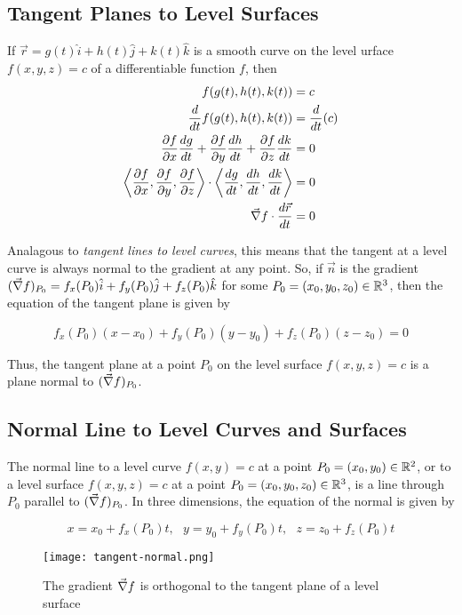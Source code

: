\subsection{Tangent Planes to Level Surfaces}
If $\vec{r} = g(t)\hat{i} + h(t)\hat{j} + k(t)\hat{k}$ is a smooth curve on the level urface $f(x, y, z) = c$ of a differentiable
function $f$, then
\begin{align*}
    f(g(t), h(t), k(t)) &= c \\
    \frac{d}{dt} f(g(t), h(t), k(t)) &= \frac{d}{dt}(c) \\
    \frac{\partial f}{\partial x} \frac{dg}{dt} + \frac{\partial f}{\partial y} \frac{dh}{dt} + \frac{\partial f}{\partial z} \frac{dk}{dt} &= 0 \\
    \left\langle \frac{\partial f}{\partial x}, \frac{\partial f}{\partial y}, \frac{\partial f}{\partial z} \right\rangle \cdot
    \left\langle \frac{dg}{dt}, \frac{dh}{dt}, \frac{dk}{dt} \right\rangle &= 0 \\
    \vec{\nabla} f \cdot \frac{d\vec{r}}{dt} &= 0
\end{align*}

Analagous to \textit{tangent lines to level curves}, this means that the tangent at a level curve is always normal to the
gradient at any point. So, if $\vec{n}$ is the gradient $(\vec{\nabla} f)_{P_0} = f_x(P_0)\hat{i} + f_y(P_0)\hat{j} + f_z(P_0)\hat{k}$
for some $P_0 = (x_0, y_0, z_0) \in \mathbb{R}^3$, then the equation of the tangent plane is given by

\begin{equation}
    f_x(P_0)(x - x_0) + f_y(P_0)(y - y_0) + f_z(P_0)(z - z_0) = 0
\end{equation}

Thus, the tangent plane at a point $P_0$ on the level surface $f(x, y, z) = c$ is a plane normal to $(\vec{\nabla} f)_{P_0}$.


\subsection{Normal Line to Level Curves and Surfaces}
The normal line to a level curve $f(x, y) = c$ at a point $P_0 = (x_0, y_0) \in \mathbb{R}^2$, or to a level surface $f(x, y, z) = c$ at a point
$P_0 = (x_0, y_0, z_0) \in \mathbb{R}^3$, is a line through $P_0$ parallel to $(\vec{\nabla} f)_{P_0}$. In three dimensions, the equation
of the normal is given by

$$x = x_0 + f_x(P_0) t, \ \ \ y = y_0 + f_y(P_0) t, \ \ \ z = z_0 + f_z(P_0) t$$

\begin{figure}[htp]
    \centering
    \texttt{[image: tangent-normal.png]}
    \caption{The gradient $\vec{\nabla} f$ is orthogonal to the tangent plane of a level surface}
\end{figure}

